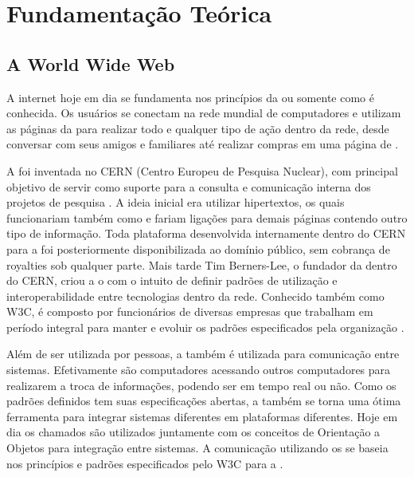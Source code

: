 \documentclass[espaco=simples,appendix=Name]{abnt}
\begin{document}
\chapter{Fundamentação Teórica}

\section{A World Wide Web}

A internet hoje em dia se fundamenta nos princípios da  ou somente  como é conhecida. Os usuários se conectam na rede mundial de computadores e utilizam as páginas da  para realizar todo e qualquer tipo de ação dentro da rede, desde conversar com seus amigos e familiares até realizar compras em uma página de .

A  foi inventada no CERN (Centro Europeu de Pesquisa Nuclear), com principal objetivo de servir como suporte para a consulta e comunicação interna dos projetos de pesquisa \cite{WebStory}. A ideia inicial era utilizar hipertextos, os quais funcionariam também como  e fariam ligações para demais páginas contendo outro tipo de informação. Toda plataforma desenvolvida internamente dentro do CERN para a  foi posteriormente disponibilizada ao domínio público, sem cobrança de royalties sob qualquer parte. Mais tarde Tim Berners-Lee, o fundador da  dentro do CERN, criou a o  com o intuito de definir padrões de utilização e interoperabilidade entre tecnologias dentro da rede. Conhecido também como W3C, é composto por funcionários de diversas empresas que trabalham em período integral para manter e evoluir os padrões especificados pela organização \cite{W3Cfacts}.

Além de ser utilizada por pessoas, a  também é utilizada para comunicação entre sistemas. Efetivamente são computadores acessando outros computadores para realizarem a troca de informações, podendo ser em tempo real ou não. Como os padrões definidos tem suas especificações abertas, a  também se torna uma ótima ferramenta para integrar sistemas diferentes em plataformas diferentes. Hoje em dia os chamados  são utilizados juntamente com os conceitos de Orientação a Objetos para integração entre sistemas. A comunicação utilizando os  se baseia nos princípios e padrões especificados pelo W3C para a  \cite{WebServices}.
\end{document}
